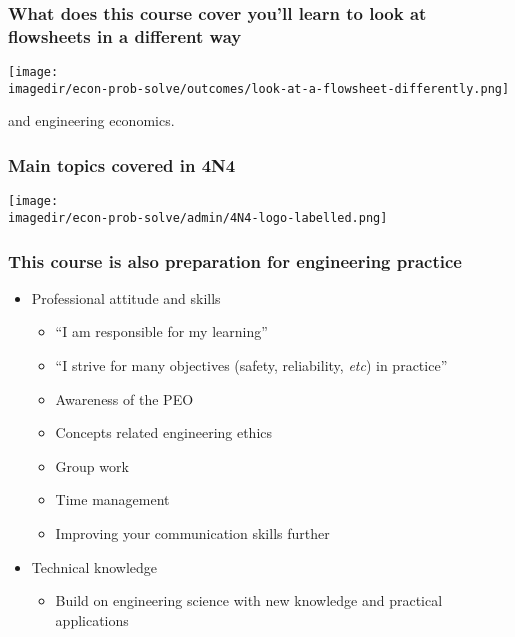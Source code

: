 \begin{frame}\frametitle{What does this course cover {\scriptsize you'll learn to look at flowsheets in a different way}}
	\begin{center}
		\texttt{[image: \\imagedir/econ-prob-solve/outcomes/look-at-a-flowsheet-differently.png]}
	\end{center}
	and engineering economics.
\end{frame}

\begin{frame}\frametitle{Main topics covered in 4N4}
	\begin{center}
		\texttt{[image: \\imagedir/econ-prob-solve/admin/4N4-logo-labelled.png]}
	\end{center}
	\vspace{-12pt}
	{\small {\color{brown}{This is a unique course: not taught anywhere else in Canada.}}}
\end{frame}

\begin{frame}\frametitle{This course is also preparation for engineering practice}
	\begin{itemize}
		\item	Professional attitude and skills
		\begin{itemize}
			\item	``I am responsible for my learning''
			\item	``I strive for many objectives (safety, reliability, \emph{etc}) in practice''
			\item	Awareness of the PEO
			\item	Concepts related engineering ethics
			\item	Group work 
			\item	Time management
			\item	Improving your communication skills further
		\end{itemize}
		\item	Technical knowledge
		\begin{itemize}
			\item	Build on {\color{purple} engineering science} with new knowledge and practical applications
		\end{itemize}
	\end{itemize}
\end{frame}

